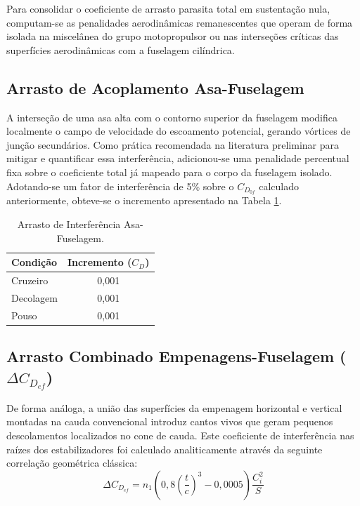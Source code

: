Para consolidar o coeficiente de arrasto parasita total em sustentação nula, computam-se as penalidades aerodinâmicas remanescentes que operam de forma isolada na miscelânea do grupo motopropulsor ou nas interseções críticas das superfícies aerodinâmicas com a fuselagem cilíndrica.

\subsection{Arrasto de Acoplamento Asa-Fuselagem}
A interseção de uma asa alta com o contorno superior da fuselagem modifica localmente o campo de velocidade do escoamento potencial, gerando vórtices de junção secundários. Como prática recomendada na literatura preliminar para mitigar e quantificar essa interferência, adicionou-se uma penalidade percentual fixa sobre o coeficiente total já mapeado para o corpo da fuselagem isolado. Adotando-se um fator de interferência de 5\% sobre o $C_{D_{0f}}$ calculado anteriormente, obteve-se o incremento apresentado na Tabela \ref{tab:interferencia_asa_fuselagem}.

\begin{table}[H]
    \centering
    \caption{Arrasto de Interferência Asa-Fuselagem.}
    \vspace{0.2cm}
    \begin{tabular}{lc}
        \toprule
        \textbf{Condição} & \textbf{Incremento ($C_D$)} \\
        \midrule
        Cruzeiro & 0,001 \\
        Decolagem & 0,001 \\
        Pouso & 0,001 \\
        \bottomrule
    \end{tabular}
    \label{tab:interferencia_asa_fuselagem}
\end{table}

\subsection{Arrasto Combinado Empenagens-Fuselagem ($\Delta C_{D_{ef}}$)}
De forma análoga, a união das superfícies da empenagem horizontal e vertical montadas na cauda convencional introduz cantos vivos que geram pequenos descolamentos localizados no cone de cauda. Este coeficiente de interferência nas raízes dos estabilizadores foi calculado analiticamente através da seguinte correlação geométrica clássica:
\begin{equation}
    \Delta C_{D_{ef}} = n_1 \left( 0,8 \left( \frac{t}{c} \right)^3 - 0,0005 \right) \frac{C_i^2}{S}
\end{equation}

